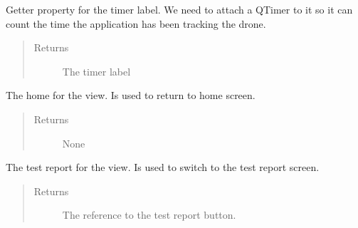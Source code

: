 \documentclass[letterpaper,10pt,english]{sphinxmanual}
\begin{document}
\begin{fulllineitems}
\begin{fulllineitems}
\begin{quote}
\begin{description}
\end{description}\end{quote}

\end{fulllineitems}


\begin{fulllineitems}
\label{\detokenize{index:src.Views.View_LoadingScreen.LoadingWindow.LblStatus}}
Getter property for the timer label. We need to attach a QTimer to it so it can count the time the
application has been tracking the drone.
\begin{quote}\begin{description}
\item[{Returns}] \leavevmode
The timer label

\end{description}\end{quote}

\end{fulllineitems}


\begin{fulllineitems}
\label{\detokenize{index:src.Views.View_LoadingScreen.LoadingWindow.del_BtnHome}}
The home for the view. Is used to return to home screen.
\begin{quote}\begin{description}
\item[{Returns}] \leavevmode
None

\end{description}\end{quote}

\end{fulllineitems}


\begin{fulllineitems}
\label{\detokenize{index:src.Views.View_LoadingScreen.LoadingWindow.del_BtnTestReport}}
The test report for the view. Is used to switch to the test report screen.
\begin{quote}\begin{description}
\item[{Returns}] \leavevmode
The reference to the test report button.


\end{description}
\end{quote}
\end{fulllineitems}
\end{fulllineitems}
\end{document}

